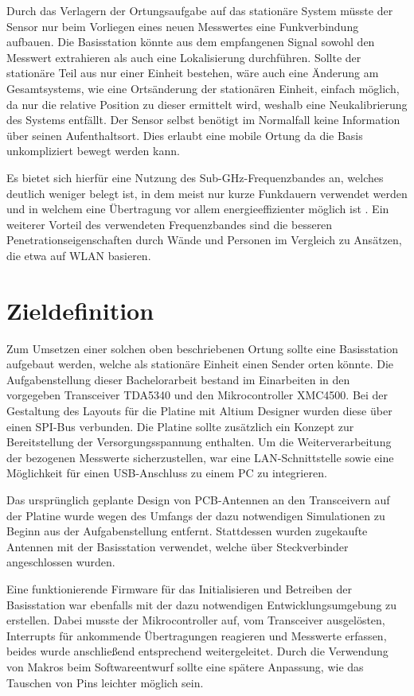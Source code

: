 Durch das Verlagern der Ortungsaufgabe auf das stationäre System müsste der Sensor nur beim Vorliegen eines neuen Messwertes eine Funkverbindung aufbauen. Die Basisstation könnte aus dem empfangenen Signal sowohl den Messwert extrahieren als auch eine Lokalisierung durchführen.
Sollte der stationäre Teil  aus nur einer Einheit bestehen, wäre auch eine Änderung am Gesamtsystems, wie eine Ortsänderung der stationären Einheit, einfach möglich, da nur die relative Position zu dieser ermittelt wird, weshalb eine Neukalibrierung des Systems entfällt. Der Sensor selbst benötigt im Normalfall keine Information über seinen Aufenthaltsort. Dies erlaubt eine mobile Ortung da die Basis unkompliziert bewegt werden kann.


Es bietet sich hierfür eine Nutzung des Sub-GHz-Frequenzbandes an, welches deutlich weniger belegt ist, in dem meist nur kurze Funkdauern verwendet werden und in welchem eine Übertragung vor allem energieeffizienter möglich ist \cite{SabolcikGHzoderSub}.
Ein weiterer Vorteil des verwendeten Frequenzbandes sind die besseren Penetrationseigenschaften durch Wände und Personen im Vergleich zu Ansätzen, die etwa auf WLAN basieren.


\section{Zieldefinition}
Zum Umsetzen einer solchen oben beschriebenen Ortung sollte eine Basisstation aufgebaut werden, welche als stationäre Einheit einen Sender orten könnte.
Die Aufgabenstellung dieser Bachelorarbeit bestand im Einarbeiten in den vorgegeben Transceiver TDA5340 und den Mikrocontroller XMC4500. Bei der Gestaltung des Layouts für die Platine mit Altium Designer wurden diese über einen SPI-Bus verbunden. Die Platine sollte zusätzlich ein Konzept zur Bereitstellung der Versorgungsspannung enthalten. Um die Weiterverarbeitung der bezogenen Messwerte sicherzustellen, war eine LAN-Schnittstelle sowie eine Möglichkeit für einen USB-Anschluss zu einem PC zu integrieren.

Das ursprünglich geplante Design von PCB-Antennen an den Transceivern auf der Platine wurde wegen des Umfangs der dazu  notwendigen Simulationen  zu Beginn aus der Aufgabenstellung entfernt. Stattdessen wurden zugekaufte Antennen mit der Basisstation verwendet, welche über Steckverbinder angeschlossen wurden.

Eine funktionierende Firmware für das Initialisieren und Betreiben der Basisstation war ebenfalls mit der dazu notwendigen Entwicklungsumgebung zu erstellen. Dabei musste der Mikrocontroller auf, vom Transceiver ausgelösten, Interrupts für ankommende Übertragungen reagieren und Messwerte erfassen, beides wurde anschließend entsprechend weitergeleitet. Durch die Verwendung von Makros beim Softwareentwurf sollte eine spätere Anpassung, wie das Tauschen von Pins leichter möglich sein.


